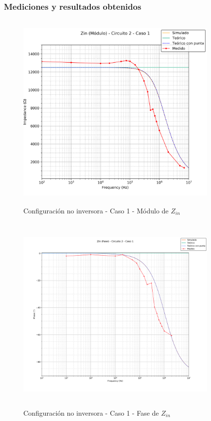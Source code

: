 \subsubsection*{Mediciones y resultados obtenidos} %
\begin{figure}[H] %
	\centering
	\includegraphics[width=10cm,height=10cm,keepaspectratio]{../EJ1/00GRAFICOS/c2c1/c2c1ZINpunta.png}
	\caption{Configuración no inversora - Caso 1 - M\'odulo de $Z_{in}$}
	\label{c2c1zinM}
\end{figure}

\begin{figure}[H] %
	\centering
	\includegraphics[width=10cm,height=10cm,keepaspectratio]{../EJ1/00GRAFICOS/c2c1/c2c1zinFASE.png}
	\caption{Configuración no inversora - Caso 1 - Fase de $Z_{in}$}
	\label{c2c1zinP}
\end{figure}

